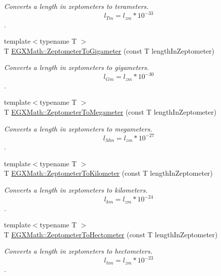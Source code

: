 \begin{DoxyCompactItemize}
\begin{DoxyCompactList}\small\item\em Converts a length in zeptometers to terameters. \[ l_{Tm}=l_{zm} * 10^{-33} \]. \end{DoxyCompactList}\item 
{\footnotesize template$<$typename T $>$ }\\T \mbox{\hyperlink{group___e_g_x_math-_conversions-_length_conversions-_s_i-_zeptometer-_s_i_ga730e0331ec8efc46b557692f5f515d03}{E\+G\+X\+Math\+::\+Zeptometer\+To\+Gigameter}} (const T length\+In\+Zeptometer)
\begin{DoxyCompactList}\small\item\em Converts a length in zeptometers to gigameters. \[ l_{Gm}=l_{zm} * 10^{-30} \]. \end{DoxyCompactList}\item 
{\footnotesize template$<$typename T $>$ }\\T \mbox{\hyperlink{group___e_g_x_math-_conversions-_length_conversions-_s_i-_zeptometer-_s_i_ga53c621beeed03e51c3ad8a5cc267a35f}{E\+G\+X\+Math\+::\+Zeptometer\+To\+Megameter}} (const T length\+In\+Zeptometer)
\begin{DoxyCompactList}\small\item\em Converts a length in zeptometers to megameters. \[ l_{Mm}=l_{zm} * 10^{-27} \]. \end{DoxyCompactList}\item 
{\footnotesize template$<$typename T $>$ }\\T \mbox{\hyperlink{group___e_g_x_math-_conversions-_length_conversions-_s_i-_zeptometer-_s_i_ga687dc5d33c63561c87a06568fd928da9}{E\+G\+X\+Math\+::\+Zeptometer\+To\+Kilometer}} (const T length\+In\+Zeptometer)
\begin{DoxyCompactList}\small\item\em Converts a length in zeptometers to kilometers. \[ l_{km}=l_{zm} * 10^{-24} \]. \end{DoxyCompactList}\item 
{\footnotesize template$<$typename T $>$ }\\T \mbox{\hyperlink{group___e_g_x_math-_conversions-_length_conversions-_s_i-_zeptometer-_s_i_ga4f9724a5c86f9e85aee3bad4d04a7faa}{E\+G\+X\+Math\+::\+Zeptometer\+To\+Hectometer}} (const T length\+In\+Zeptometer)
\begin{DoxyCompactList}\small\item\em Converts a length in zeptometers to hectometers. \[ l_{hm}=l_{zm} * 10^{-23} \]. \end{DoxyCompactList}\item 

\end{DoxyCompactItemize}

